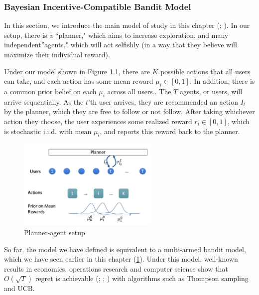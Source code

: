 \documentclass[
  letterpaper,
  DIV=11,
  numbers=noendperiod,
  oneside]{scrreprt}
\theoremstyle{remark}
\begin{document}
\subsubsection*{Bayesian Incentive-Compatible Bandit
Model}\label{bayesian-incentive-compatible-bandit-model}

In this section, we introduce the main model of study in this chapter
(;
). In our setup, there is a ``planner," which aims to
increase exploration, and many independent''agents," which will act
selfishly (in a way that they believe will maximize their individual
reward).

Under our model shown in Figure \hyperref[fig:planner-agent]{1.1}, there
are \(K\) possible actions that all users can take, and each action has
some mean reward \(\mu_i \in [0, 1]\). In addition, there is a common
prior belief on each \(\mu_i\) across all users.. The \(T\) agents, or
users, will arrive sequentially. As the \(t\)'th user arrives, they are
recommended an action \(I_t\) by the planner, which they are free to
follow or not follow. After taking whichever action they choose, the
user experiences some realized reward \(r_i \in [0, 1]\), which is
stochastic i.i.d. with mean \(\mu_i\), and reports this reward back to
the planner.

\begin{figure}

{\centering \includegraphics[width=0.6\textwidth,height=\textheight]{Figures/planner-agent-setup.png}

}

\caption{Planner-agent setup}

\end{figure}%

So far, the model we have defined is equivalent to a multi-armed bandit
model, which we have seen earlier in this chapter
(\hyperref[4optim]{1}). Under this model, well-known results in
economics, operations research and computer science show that
\(O(\sqrt{T})\) regret is achievable
(; ; ) with algorithms such as Thompson sampling and UCB.
\end{document}
